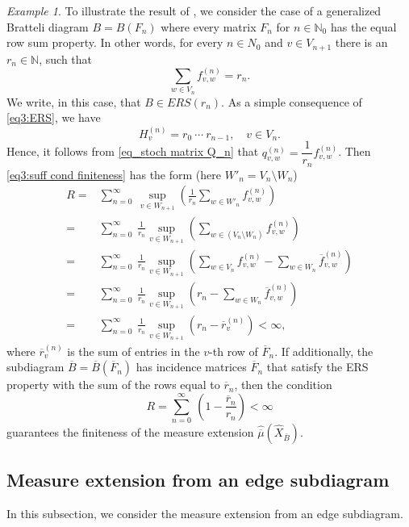 \documentclass[11pt,reqno]{amsart}
\theoremstyle{definition}
\theoremstyle{remark}
\newtheorem{example}[definition]{Example}
\theoremstyle{plain}
\def\ol{\overline}
\def\wh{\widehat}
\newcommand{\N}{\mathbb N}
\newcommand{\be}{\begin{equation}}
\newcommand{\ee}{\end{equation}}
\newcommand{\ba}{\begin{aligned}}
\newcommand{\ea}{\end{aligned}}
\numberwithin{equation}{section}
\begin{document}
\begin{example}
To illustrate the result of , we consider the case of a generalized Bratteli diagram $B = B(F_n)$ 
where every matrix $F_n$ for $n\in \N_0$ has the equal row sum property. In other words, 
for every $n \in N_{0}$ and $v \in V_{n+1}$ there is an $r_n \in \N$, such that 
\be\label{eq3:ERS}
\sum_{w \in V_n} f^{(n)}_{v,w} = r_n.
\ee
We write, in this case, that $B \in ERS(r_n)$. As a simple consequence
of \eqref{eq3:ERS}, we have
$$
H^{(n)}_v = r_0\ \cdots \ r_{n-1}, \quad v \in V_n.
$$
Hence, it follows from \eqref{eq_stoch matrix Q_n} that
$q^{(n)}_{v,w} = \dfrac{1}{r_n}f^{(n)}_{v,w}$. 
Then \eqref{eq3:suff cond finiteness} has the form (here $W'_n =
V_n \setminus W_n$)
\be\label{eq3:example}
\ba
R = & \sum_{n=0}^\infty\  \sup_{v \in W_{n+1}} \left( \frac{1}{r_n}
\sum_{w \in W'_n} f^{(n)}_{v,w}\right)\\ 
= & \sum_{n=0}^\infty\ \frac{1}{r_n} \sup_{v \in W_{n+1}} \left(
\sum_{w \in (V_n \setminus W_n)} f^{(n)}_{v,w}\right)\\
= & \sum_{n=0}^\infty\ \frac{1}{r_n} \sup_{v \in W_{n+1}} \left(
\sum_{w \in V_n} f^{(n)}_{v,w} -  \sum_{w \in W_n} \ol f^{(n)}_{v,w}  \right)\\ 
= &  \sum_{n=0}^\infty\ \frac{1}{r_n} \sup_{v \in W_{n+1}} \left( r_n - \sum_{w \in W_n}\ol f^{(n)}_{v,w}\right)\\
= & \sum_{n=0}^\infty\ \frac{1}{r_n} \sup_{v \in W_{n+1}} ( r_n - \ol r_v^{(n)})
< \infty, 
\ea
\ee
where $\ol r_v^{(n)}$ is the sum of entries in the $v$-th row of 
$\ol F_n$. 
If additionally, the subdiagram $\ol B  = \ol B(\ol F_n) $ has
incidence matrices $\ol F_n$ that satisfy the ERS property with the sum of the rows equal to $\ol r_n$, then the condition
$$
R = \sum_{n=0}^\infty\ (1 - \frac{\ol r_n}{r_n}) < \infty
$$
guarantees the finiteness of the measure extension $\wh{\ol\mu}
(\wh X_{\ol B})$. 
\end{example}

\subsection{Measure extension from an edge subdiagram}
In this subsection, we consider the measure extension 
from an edge subdiagram.  
\end{document}
